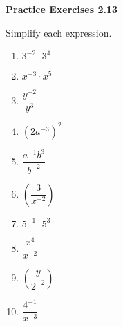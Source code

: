 \vspace{1ex}
\noindent\textbf{Practice Exercises 2.13}

\vspace{0.75ex}

Simplify each expression.
\begin{multicols}{3}
\begin{enumerate}[noitemsep, label = \color{blue}\arabic*. ]
    \item \( 3^{-2} \cdot 3^4 \)
    \item \( x^{-3} \cdot x^5 \)
    \item \( \dfrac{y^{-2}}{y^3} \)
    \item \( (2a^{-3})^2 \)
    \item \( \dfrac{a^{-1}b^3}{b^{-2}} \)
    \item \( \left( \dfrac{3}{x^{-2}} \right) \)
    \item \( 5^{-1} \cdot 5^3 \)
    \item \( \dfrac{x^4}{x^{-2}} \)
    \item \( \left( \dfrac{y}{2^{-2}} \right) \)
    \item \( \dfrac{4^{-1}}{x^{-3}} \)
\end{enumerate}
\end{multicols}
